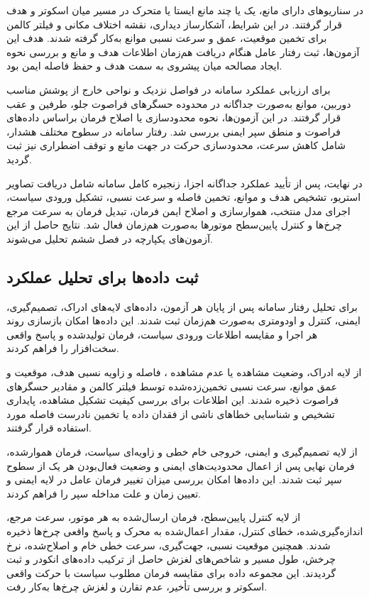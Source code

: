 در سناریوهای دارای مانع، یک یا چند مانع ایستا یا متحرک در مسیر میان اسکوتر و هدف قرار گرفتند. در این شرایط، آشکارساز دیداری، نقشه اختلاف مکانی و فیلتر کالمن برای تخمین موقعیت، عمق و سرعت نسبی موانع به‌کار گرفته شدند. هدف این آزمون‌ها، ثبت رفتار عامل هنگام دریافت هم‌زمان اطلاعات هدف و مانع و بررسی نحوه ایجاد مصالحه میان پیشروی به سمت هدف و حفظ فاصله ایمن بود.

برای ارزیابی عملکرد سامانه در فواصل نزدیک و نواحی خارج از پوشش مناسب دوربین، موانع به‌صورت جداگانه در محدوده حسگرهای فراصوت جلو، طرفین و عقب قرار گرفتند. در این آزمون‌ها، نحوه محدودسازی یا اصلاح فرمان براساس داده‌های فراصوت و منطق سپر ایمنی بررسی شد. رفتار سامانه در سطوح مختلف هشدار، شامل کاهش سرعت، محدودسازی حرکت در جهت مانع و توقف اضطراری نیز ثبت گردید.

در نهایت، پس از تأیید عملکرد جداگانه اجزا، زنجیره کامل سامانه شامل دریافت تصاویر استریو، تشخیص هدف و موانع، تخمین فاصله و سرعت نسبی، تشکیل ورودی سیاست، اجرای مدل منتخب، هموارسازی و اصلاح ایمن فرمان، تبدیل فرمان به سرعت مرجع چرخ‌ها و کنترل پایین‌سطح موتورها به‌صورت هم‌زمان فعال شد. نتایج حاصل از این آزمون‌های یکپارچه در فصل ششم تحلیل می‌شوند.

\subsection{ثبت داده‌ها برای تحلیل عملکرد}
\label{subsec:real_test_data_logging}

برای تحلیل رفتار سامانه پس از پایان هر آزمون، داده‌های لایه‌های ادراک، تصمیم‌گیری، ایمنی، کنترل و اودومتری به‌صورت هم‌زمان ثبت شدند. این داده‌ها امکان بازسازی روند هر اجرا و مقایسه اطلاعات ورودی سیاست، فرمان تولیدشده و پاسخ واقعی سخت‌افزار را فراهم کردند.

از لایه ادراک، وضعیت مشاهده یا عدم مشاهده ، فاصله و زاویه نسبی هدف، موقعیت و عمق موانع، سرعت نسبی تخمین‌زده‌شده توسط فیلتر کالمن و مقادیر حسگرهای فراصوت ذخیره شدند. این اطلاعات برای بررسی کیفیت تشکیل مشاهده، پایداری تشخیص و شناسایی خطاهای ناشی از فقدان داده یا تخمین نادرست فاصله مورد استفاده قرار گرفتند.

از لایه تصمیم‌گیری و ایمنی، خروجی خام خطی و زاویه‌ای سیاست، فرمان هموارشده، فرمان نهایی پس از اعمال محدودیت‌های ایمنی و وضعیت فعال‌بودن هر یک از سطوح سپر ثبت شدند. این داده‌ها امکان بررسی میزان تغییر فرمان عامل در لایه ایمنی و تعیین زمان و علت مداخله سپر را فراهم کردند.

از لایه کنترل پایین‌سطح، فرمان ارسال‌شده به هر موتور، سرعت مرجع،  اندازه‌گیری‌شده، خطای کنترل، مقدار اعمال‌شده به محرک و پاسخ واقعی چرخ‌ها ذخیره شدند. همچنین موقعیت نسبی، جهت‌گیری، سرعت خطی خام و اصلاح‌شده، نرخ چرخش، طول مسیر و شاخص‌های لغزش حاصل از ترکیب داده‌های انکودر و  ثبت گردیدند. این مجموعه داده برای مقایسه فرمان مطلوب سیاست با حرکت واقعی اسکوتر و بررسی تأخیر، عدم تقارن و لغزش چرخ‌ها به‌کار رفت.

